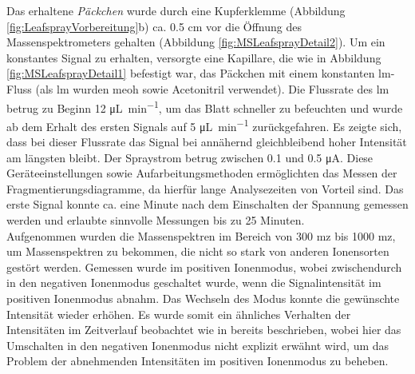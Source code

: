 Das erhaltene \textit{Päckchen} wurde durch eine Kupferklemme (Abbildung \ref{fig:LeafsprayVorbereitung}b) ca. 0.5 cm  vor die Öffnung des Massenspektrometers gehalten (Abbildung \ref{fig:MSLeafsprayDetail2}). Um ein konstantes Signal zu erhalten, versorgte eine Kapillare, die wie in Abbildung \ref{fig:MSLeafsprayDetail1} befestigt war, das Päckchen mit einem konstanten \gls{lm}-Fluss (als \gls{lm} wurden \gls{meoh} sowie Acetonitril verwendet). Die Flussrate des \gls{lm} betrug zu Beginn 12 \si{\uL\per\minute}, um das Blatt schneller zu befeuchten und wurde ab dem Erhalt des ersten Signals auf 5 \si{\uL\per\minute} zurückgefahren. Es zeigte sich, dass bei dieser Flussrate das Signal bei annähernd gleichbleibend hoher Intensität am längsten bleibt. Der Spraystrom betrug zwischen 0.1 und 0.5 \si{\micro\ampere}. Diese Geräteeinstellungen sowie Aufarbeitungsmethoden ermöglichten das Messen der Fragmentierungsdiagramme, da hierfür lange Analysezeiten von Vorteil sind. Das erste Signal konnte ca. eine Minute nach dem Einschalten der Spannung gemessen werden und erlaubte sinnvolle Messungen bis zu 25 Minuten. \\

Aufgenommen wurden die Massenspektren im Bereich von 300 \gls{mz} bis 1000 \gls{mz}, um  Massenspektren zu bekommen, die nicht so stark von anderen Ionensorten gestört werden. Gemessen wurde im positiven Ionenmodus, wobei zwischendurch in den negativen Ionenmodus geschaltet wurde, wenn die Signalintensität im positiven Ionenmodus abnahm. Das Wechseln des Modus konnte die gewünschte Intensität wieder erhöhen. Es wurde somit ein ähnliches Verhalten der Intensitäten im Zeitverlauf beobachtet wie in \cite{RapidScreeningLeafSpray} bereits beschrieben, wobei hier das Umschalten in den negativen Ionenmodus nicht explizit erwähnt wird, um das Problem der abnehmenden Intensitäten im positiven Ionenmodus zu beheben.


